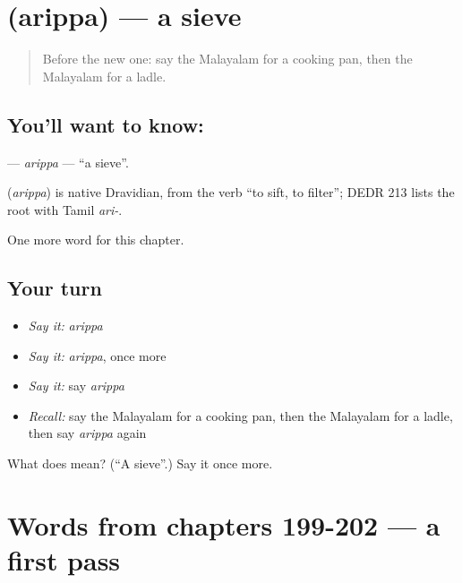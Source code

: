 \section[\texorpdfstring{\ml{അരിപ്പ} (arippa)}{അരിപ്പ (arippa)}]{ (arippa) — a sieve}

\label{lesson:ML-C207-arippa}



\begin{quote}
Before the new one: say the Malayalam for a cooking pan, then the Malayalam for a ladle.
\end{quote}

\subsection*{You'll want to know: }
\textbf{} — \emph{arippa} — \textquotedblleft{}a sieve\textquotedblright{}.

\begin{cousinweb}
\textbf{} (\emph{arippa}) is native Dravidian, from the verb \textquotedblleft{}to sift, to filter\textquotedblright{}; DEDR 213 lists the root with Tamil \emph{ari-}.
\end{cousinweb}

\begin{grammarlens}[title={What you've built}]
One more word for this chapter.
\end{grammarlens}

\subsection*{Your turn}
\begin{itemize}
\raggedright
  \item \emph{Say it:} \emph{arippa}
  \item \emph{Say it:} \emph{arippa}, once more
  \item \emph{Say it:} say \emph{arippa}
  \item \emph{Recall:} say the Malayalam for a cooking pan, then the Malayalam for a ladle, then say \emph{arippa} again
\end{itemize}

\begin{tcolorbox}[breakable,colback=teal!4,colframe=teal!35!black,title={Before you move on}]
What does  mean? (\textquotedblleft{}A sieve\textquotedblright{}.) Say it once more.
\end{tcolorbox}
\section[(dialogue)]{Words from chapters 199-202 — a first pass}

